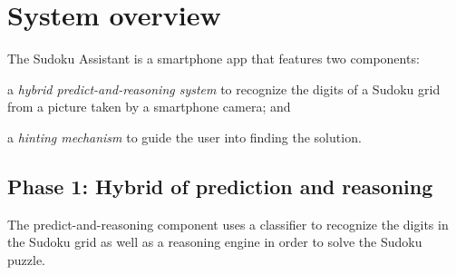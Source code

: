 \documentclass[letterpaper]{article} %
\begin{document}


%



\section{System overview}

The Sudoku Assistant is a smartphone app that features two components:
\begin{inparaenum}[(1)]
	\item a \emph{hybrid predict-and-reasoning system} to recognize the digits of a Sudoku grid from a picture taken by a smartphone camera; and
	\item a \emph{hinting mechanism} to guide the user into finding the solution.
\end{inparaenum}

\subsection{Phase 1: Hybrid of prediction and reasoning}
The predict-and-reasoning component uses a classifier to recognize the digits in the Sudoku grid as well as a reasoning engine in order to solve the Sudoku puzzle. 

\end{document}
